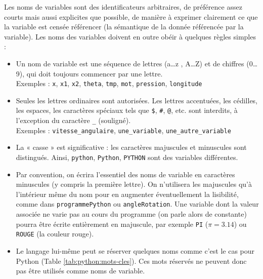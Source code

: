 Les noms de variables sont des identificateurs arbitraires, de préférence assez courts mais aussi 
explicites que possible, de manière à exprimer clairement ce que la variable est censée 
référencer (la sémantique de la donnée référencée par la variable). 
Les noms des variables doivent en outre obéir à quelques règles simples :
\begin{itemize}
\item Un nom de variable est une séquence de lettres (a\ldots  z , A\ldots  Z) 
		et de chiffres (0\ldots  9), qui
      	doit toujours commencer par une lettre.\\
      	Exemples : \texttt{x}, \texttt{x1}, \texttt{x2}, \texttt{theta}, \texttt{tmp},
      	\texttt{mot}, \texttt{pression}, \texttt{longitude} 
\item Seules les lettres ordinaires sont autorisées. Les lettres accentuées, les cédilles, 
		les espaces, les caractères spéciaux tels que {\tt \$}, {\tt \#}, {\tt @}, etc. 
		sont interdits, à l'exception du caractère {\tt \_} (souligné).\\
		Exemples : \texttt{vitesse\_angulaire}, \texttt{une\_variable},
		\texttt{une\_autre\_variable}
\item La « casse » est significative : les caractères majuscules et minuscules sont 
		distingués. Ainsi,
      	{\tt python}, {\tt Python}, {\tt PYTHON} sont des variables différentes. 
\item Par convention, on écrira l'essentiel des noms de variable en caractères minuscules 
	(y compris la première lettre). 
	On n'utilisera les majuscules qu'à l'intérieur même du nom  
	pour en augmenter éventuellement la lisibilité, comme dans {\tt programmePython} ou
	{\tt angleRotation}.
	Une variable dont la valeur associée ne varie pas au cours du programme 
	(on parle alors de constante)
	pourra être écrite entièrement en majuscule, par exemple \texttt{PI} ($\pi = 3.14$) ou
	\texttt{ROUGE} (la couleur rouge).
\item Le langage lui-même peut se réserver quelques noms comme c'est le cas pour {\sc Python}
	(Table \ref{tab:python:mots-cles}).
	Ces mots réservés ne peuvent donc pas être utilisés comme noms de variable.


\end{itemize}
